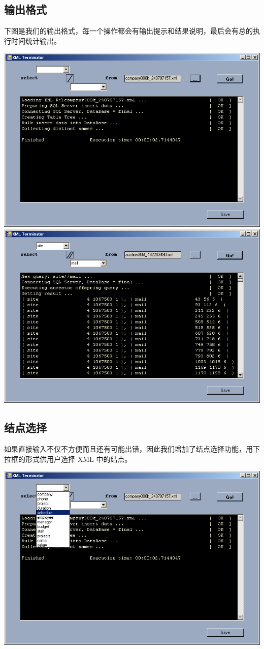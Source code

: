 \documentclass[10pt]{article}
\begin{document}
\begin{CJK}{UTF8}{gbsn}
\subsection{输出格式}
下图是我们的输出格式，每一个操作都会有输出提示和结果说明，最后会有总的执行时间统计输出。
\begin{center}
\includegraphics[width=0.9\linewidth]{loadxml.png}
\includegraphics[width=0.9\linewidth]{test35_sitemail.png}
\end{center}

\subsection{结点选择}
如果直接输入不仅不方便而且还有可能出错，因此我们增加了结点选择功能，用下拉框的形式供用户选择 XML 中的结点。
\begin{center}
\includegraphics[width=0.9\linewidth]{selectnode.png}
\end{center}


\end{CJK}
\end{document}
